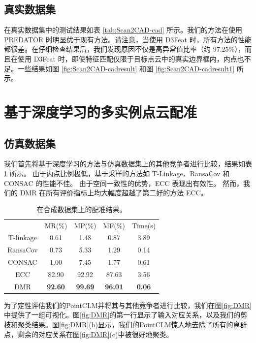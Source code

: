 \subsection{真实数据集}
在真实数据集中的测试结果如表 \ref{tab:Scan2CAD-cad} 所示。我们的方法在使用 PREDATOR 时明显优于现有方法。请注意，当使用 D3Feat 时，所有方法的性能都很差。在仔细检查结果后，我们发现原因不仅是高异常值比率（约 $97.25\%$），而且在使用 D3Feat 时，即使特征匹配仅限于目标点云中的真实边界框内，内点也不足。一些结果如图 \ref{fig:Scan2CAD-cadresult} 和图 \ref{fig:Scan2CAD-cadresult1} 所示。


\section{基于深度学习的多实例点云配准}
\subsection{仿真数据集}
我们首先将基于深度学习的方法与仿真数据集上的其他竞争者进行比较，结果如表 \ref{table1} 所示。
由于内点比例极低，基于采样的方法如 T-Linkage、RansaCov 和 CONSAC 的性能不佳。
由于空间一致性的优势，ECC 表现出有效性。
然而，我们的 DMR 在所有评价指标上均大幅度超越了第二好的方法 ECC。

\setlength{\tabcolsep}{8pt}
\begin{table}[ht]
  \centering
  \caption{在合成数据集上的配准结果。}
  \begin{tabular}{ccccc}
    \hline\noalign{\smallskip}
  & MR(\%)         & MP(\%)         & MF(\%)         & Time(s)       \\
  \noalign{\smallskip}
  \hline
  \noalign{\smallskip}
  T-linkage \cite{magri2014t} & 0.61           & 1.48           & 0.87           & 3.89          \\
  RansaCov \cite{magri2016multiple}  & 0.73           & 5.33           & 1.29           & 0.14          \\
  CONSAC \cite{kluger2020consac}    & 1.00           & 7.45           & 1.77           & 0.61          \\
  ECC         & 82.90          & 92.92          & 87.63          & 3.56          \\
  DMR              & \textbf{92.60} & \textbf{99.69} & \textbf{96.01} & \textbf{0.06} \\
  \hline
  \end{tabular}
  \label{table1}
\end{table}

为了定性评估我们的PointCLM并将其与其他竞争者进行比较，我们在图\ref{fig:DMR}中提供了一组可视化。图\ref{fig:DMR}的第一行显示了输入对应关系，以及我们的剪枝和聚类结果。图\ref{fig:DMR}(b)显示，我们的PointCLM惊人地去除了所有的离群点，剩余的对应关系在图\ref{fig:DMR}(c)中被很好地聚类。

